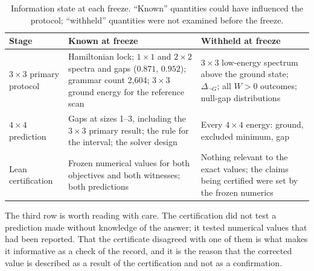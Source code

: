 \documentclass[11pt,a4paper]{article}
\theoremstyle{plain}
\theoremstyle{definition}
\theoremstyle{remark}
\begin{document}
\begin{table}[t]
\centering\small
\caption{Information state at each freeze. ``Known'' quantities could have influenced the protocol; ``withheld'' quantities were not examined before the freeze.}
\label{tab:info}
\begin{tabularx}{\linewidth}{@{}p{2.6cm}XX@{}}
\toprule
Stage & Known at freeze & Withheld at freeze\\
\midrule
$3\times3$ primary protocol & Hamiltonian lock; $1\times1$ and $2\times2$ spectra and gaps ($0.871$, $0.952$); grammar count 2{,}604; $3\times3$ ground energy for the reference scan & $3\times3$ low-energy spectrum above the ground state; $\Delta_{\neg G}$; all $W>0$ outcomes; null-gap distributions\\[0.3em]
$4\times4$ prediction & Gaps at sizes 1--3, including the $3\times3$ primary result; the rule for the interval; the solver design & Every $4\times4$ energy: ground, excluded minimum, gap\\[0.3em]
Lean certification & Frozen numerical values for both objectives and both witnesses; both predictions & Nothing relevant to the exact values; the claims being certified were set by the frozen numerics\\
\bottomrule
\end{tabularx}
\end{table}

The third row is worth reading with care. The certification did not test a prediction made without knowledge of the answer; it tested numerical values that had been reported. That the certificate disagreed with one of them is what makes it informative as a check of the record, and it is the reason that the corrected value is described as a result of the certification and not as a confirmation.
\end{document}
